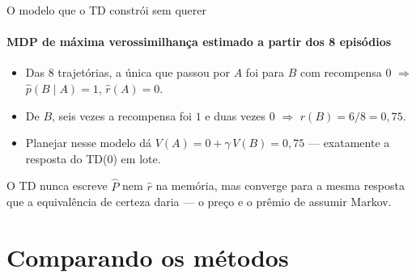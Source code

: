 \documentclass[aspectratio=169, 11pt]{beamer}
\begin{document}
\begin{frame}{O modelo que o TD constrói sem querer}
  \framesubtitle{MDP de máxima verossimilhança estimado a partir dos 8 episódios}
  \centering

  \smallskip
  \raggedright
  \begin{itemize}\setlength{\itemsep}{0.2ex}
    \item Das 8 trajetórias, a única que passou por $A$ foi para $B$
      com recompensa $0$ $\Rightarrow$ $\hat p(B \mid A) = 1$, $\hat r(A) = 0$.
    \item De $B$, seis vezes a recompensa foi $1$ e duas vezes $0$
      $\Rightarrow$ $\hat r(B) = 6/8 = 0{,}75$.
    \item Planejar nesse modelo dá $V(A) = 0 + \gamma\,V(B) = 0{,}75$ —
      \alert{exatamente a resposta do TD(0) em lote}.
  \end{itemize}

  \begin{ideiabox}
    O TD nunca escreve $\hat P$ nem $\hat r$ na memória, mas converge para
    a mesma resposta que a equivalência de certeza daria — o preço e o
    prêmio de assumir Markov.
  \end{ideiabox}
\end{frame}

\section{Comparando os métodos}
\end{document}
